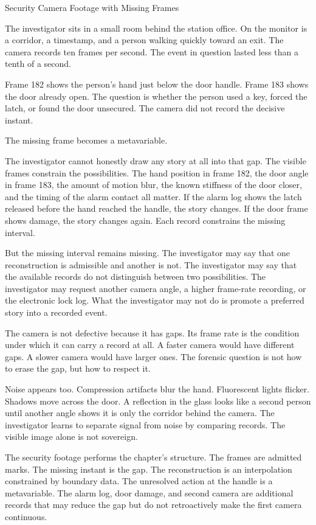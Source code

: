 \begin{coda}{Security Camera Footage with Missing Frames}

The investigator sits in a small room behind the station office. On the monitor
is a corridor, a timestamp, and a person walking quickly toward an exit. The
camera records ten frames per second. The event in question lasted less than a
tenth of a second.

Frame 182 shows the person's hand just below the door handle. Frame 183 shows
the door already open. The question is whether the person used a key, forced
the latch, or found the door unsecured. The camera did not record the decisive
instant.

The missing frame becomes a metavariable.

The investigator cannot honestly draw any story at all into that gap. The
visible frames constrain the possibilities. The hand position in frame 182, the
door angle in frame 183, the amount of motion blur, the known stiffness of the
door closer, and the timing of the alarm contact all matter. If the alarm log
shows the latch released before the hand reached the handle, the story changes.
If the door frame shows damage, the story changes again. Each record constrains
the missing interval.

But the missing interval remains missing. The investigator may say that one
reconstruction is admissible and another is not. The investigator may say that
the available records do not distinguish between two possibilities. The
investigator may request another camera angle, a higher frame-rate recording, or
the electronic lock log. What the investigator may not do is promote a preferred
story into a recorded event.

The camera is not defective because it has gaps. Its frame rate is the
condition under which it can carry a record at all. A faster camera would have
different gaps. A slower camera would have larger ones. The forensic question is
not how to erase the gap, but how to respect it.

Noise appears too. Compression artifacts blur the hand. Fluorescent lights
flicker. Shadows move across the door. A reflection in the glass looks like a
second person until another angle shows it is only the corridor behind the
camera. The investigator learns to separate signal from noise by comparing
records. The visible image alone is not sovereign.

The security footage performs the chapter's structure. The frames are admitted
marks. The missing instant is the gap. The reconstruction is an interpolation
constrained by boundary data. The unresolved action at the handle is a
metavariable. The alarm log, door damage, and second camera are additional
records that may reduce the gap but do not retroactively make the first camera
continuous.


\end{coda}
